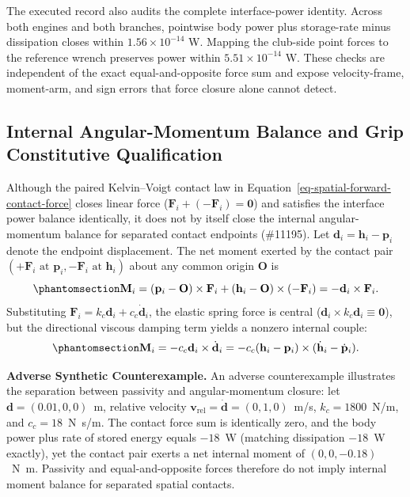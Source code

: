 \documentclass[
  letterpaper,
]{report}
\begin{document}
The executed record also audits the complete interface-power identity.
Across both engines and both branches, pointwise body power plus
storage-rate minus dissipation closes within \(1.56\times10^{-14}\) W.
Mapping the club-side point forces to the reference wrench preserves
power within \(5.51\times10^{-14}\) W. These checks are independent of
the exact equal-and-opposite force sum and expose velocity-frame,
moment-arm, and sign errors that force closure alone cannot detect.

\subsection{Internal Angular-Momentum Balance and Grip Constitutive Qualification}\label{sec-spatial-carriage-angular-momentum-qualification}

Although the paired Kelvin--Voigt contact law in Equation~\eqref{eq-spatial-forward-contact-force} closes linear force (\(\mathbf F_i + (-\mathbf F_i) = \mathbf 0\)) and satisfies the interface power balance identically, it does not by itself close the internal angular-momentum balance for separated contact endpoints (\#11195). Let \(\mathbf d_i = \mathbf h_i - \mathbf p_i\) denote the endpoint displacement. The net moment exerted by the contact pair \((+\mathbf F_i \text{ at } \mathbf p_i, -\mathbf F_i \text{ at } \mathbf h_i)\) about any common origin \(\mathbf O\) is
\begin{equation}\phantomsection\label{eq-spatial-carriage-contact-pair-moment}{
\mathbf M_i = (\mathbf p_i - \mathbf O)\times \mathbf F_i + (\mathbf h_i - \mathbf O)\times (-\mathbf F_i) = -\mathbf d_i \times \mathbf F_i.
}\end{equation}
Substituting \(\mathbf F_i = k_c \mathbf d_i + c_c \dot{\mathbf d}_i\), the elastic spring force is central (\(\mathbf d_i \times k_c \mathbf d_i \equiv \mathbf 0\)), but the directional viscous damping term yields a nonzero internal couple:
\begin{equation}\phantomsection\label{eq-spatial-carriage-damper-moment}{
\mathbf M_i = -c_c \mathbf d_i \times \dot{\mathbf d}_i = -c_c (\mathbf h_i - \mathbf p_i)\times (\dot{\mathbf h}_i - \dot{\mathbf p}_i).
}\end{equation}

\noindent\textbf{Adverse Synthetic Counterexample.} An adverse counterexample illustrates the separation between passivity and angular-momentum closure: let \(\mathbf d = (0.01, 0, 0)\)~m, relative velocity \(\mathbf v_{\mathrm{rel}} = \dot{\mathbf d} = (0, 1, 0)\)~m/s, \(k_c = 1800\)~N/m, and \(c_c = 18\)~N~s/m. The contact force sum is identically zero, and the body power plus rate of stored energy equals \(-18\)~W (matching dissipation \(-18\)~W exactly), yet the contact pair exerts a net internal moment of \((0, 0, -0.18)\)~N~m. Passivity and equal-and-opposite forces therefore do not imply internal moment balance for separated spatial contacts.
\end{document}
